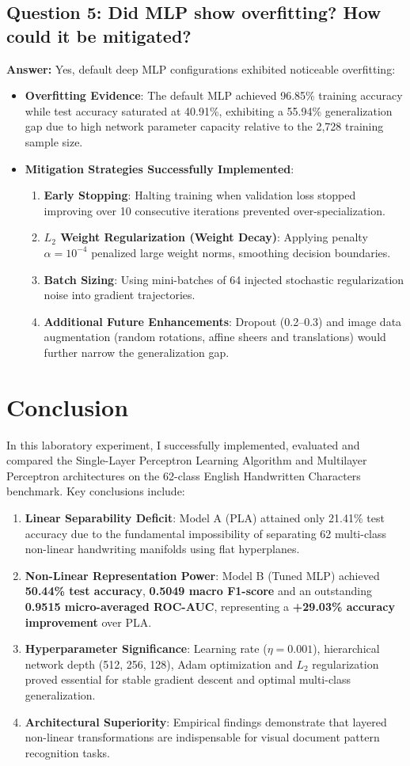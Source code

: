 \documentclass[12pt,a4paper]{article}
\begin{document}
\subsection*{Question 5: Did MLP show overfitting? How could it be mitigated?}
\textbf{Answer:}
Yes, default deep MLP configurations exhibited noticeable overfitting:
\begin{itemize}
\item \textbf{Overfitting Evidence}: The default MLP achieved 96.85\% training accuracy while test accuracy saturated at 40.91\%, exhibiting a 55.94\% generalization gap due to high network parameter capacity relative to the 2,728 training sample size.
\item \textbf{Mitigation Strategies Successfully Implemented}:
\begin{enumerate}
\item \textbf{Early Stopping}: Halting training when validation loss stopped improving over 10 consecutive iterations prevented over-specialization.
\item \textbf{$L_2$ Weight Regularization (Weight Decay)}: Applying penalty $\alpha = 10^{-4}$ penalized large weight norms, smoothing decision boundaries.
\item \textbf{Batch Sizing}: Using mini-batches of 64 injected stochastic regularization noise into gradient trajectories.
\item \textbf{Additional Future Enhancements}: Dropout (0.2--0.3) and image data augmentation (random rotations, affine sheers and translations) would further narrow the generalization gap.
\end{enumerate}
\end{itemize}

\section{Conclusion}
In this laboratory experiment, I successfully implemented, evaluated and compared the Single-Layer Perceptron Learning Algorithm and Multilayer Perceptron architectures on the 62-class English Handwritten Characters benchmark. Key conclusions include:
\begin{enumerate}
\item \textbf{Linear Separability Deficit}: Model A (PLA) attained only 21.41\% test accuracy due to the fundamental impossibility of separating 62 multi-class non-linear handwriting manifolds using flat hyperplanes.
\item \textbf{Non-Linear Representation Power}: Model B (Tuned MLP) achieved \textbf{50.44\% test accuracy}, \textbf{0.5049 macro F1-score} and an outstanding \textbf{0.9515 micro-averaged ROC-AUC}, representing a \textbf{+29.03\% accuracy improvement} over PLA.
\item \textbf{Hyperparameter Significance}: Learning rate ($\eta = 0.001$), hierarchical network depth (512, 256, 128), Adam optimization and $L_2$ regularization proved essential for stable gradient descent and optimal multi-class generalization.
\item \textbf{Architectural Superiority}: Empirical findings demonstrate that layered non-linear transformations are indispensable for visual document pattern recognition tasks.
\end{enumerate}
\end{document}
